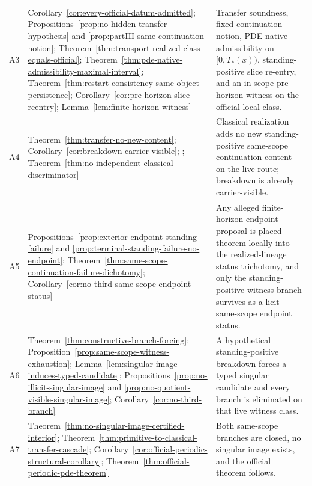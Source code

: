 \begin{proposition}
\begin{center}
\begin{tabularx}{0.98\textwidth}{@{}L{0.08\textwidth}L{0.33\textwidth}Y@{}}
A3 & Corollary~\ref{cor:every-official-datum-admitted}; Propositions~\ref{prop:no-hidden-transfer-hypothesis} and \ref{prop:partIII-same-continuation-notion}; Theorem~\ref{thm:transport-realized-class-equals-official}; Theorem~\ref{thm:pde-native-admissibility-maximal-interval}; Theorem~\ref{thm:restart-consistency-same-object-persistence}; Corollary~\ref{cor:pre-horizon-slice-reentry}; Lemma~\ref{lem:finite-horizon-witness} & Transfer soundness, fixed continuation notion, PDE-native admissibility on $[0,T_*(x))$, standing-positive slice re-entry, and an in-scope pre-horizon witness on the official local class.\\
A4 & Theorem~\ref{thm:transfer-no-new-content}; Corollary~\ref{cor:breakdown-carrier-visible}; \HorizonDetectabilityRef{}; Theorem~\ref{thm:no-independent-classical-discriminator} & Classical realization adds no new standing-positive same-scope continuation content on the live route; breakdown is already carrier-visible.\\
A5 & Propositions~\ref{prop:exterior-endpoint-standing-failure} and \ref{prop:terminal-standing-failure-no-endpoint}; Theorem~\ref{thm:same-scope-continuation-failure-dichotomy}; Corollary~\ref{cor:no-third-same-scope-endpoint-status} & Any alleged finite-horizon endpoint proposal is placed theorem-locally into the realized-lineage status trichotomy, and only the standing-positive witness branch survives as a licit same-scope endpoint status.\\
A6 & Theorem~\ref{thm:constructive-branch-forcing}; Proposition~\ref{prop:same-scope-witness-exhaustion}; Lemma~\ref{lem:singular-image-induces-typed-candidate}; Propositions~\ref{prop:no-illicit-singular-image} and \ref{prop:no-quotient-visible-singular-image}; Corollary~\ref{cor:no-third-branch} & A hypothetical standing-positive breakdown forces a typed singular candidate and every branch is eliminated on that live witness class.\\
A7 & Theorem~\ref{thm:no-singular-image-certified-interior}; Theorem~\ref{thm:primitive-to-classical-transfer-cascade}; Corollary~\ref{cor:official-periodic-structural-corollary}; Theorem~\ref{thm:official-periodic-pde-theorem} & Both same-scope branches are closed, no singular image exists, and the official theorem follows.\\
\bottomrule
\end{tabularx}
\end{center}
\end{proposition}


